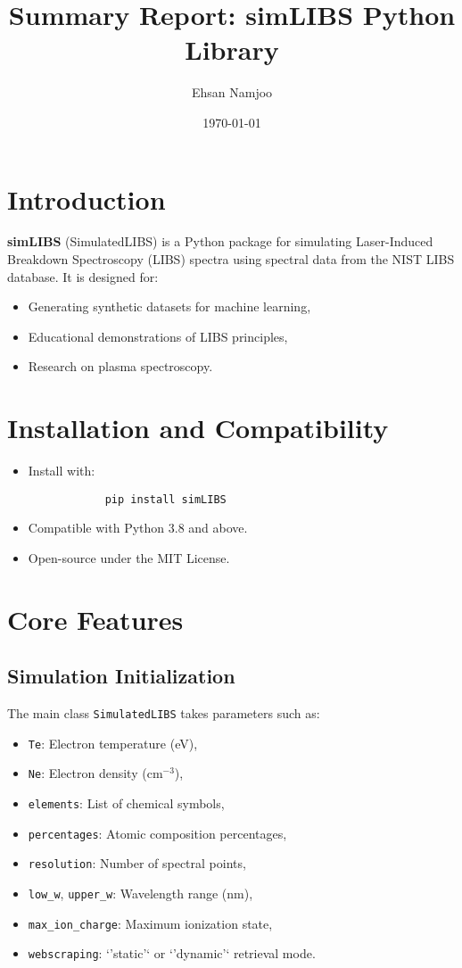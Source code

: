 \documentclass[12pt,a4paper]{article}
\title{Summary Report: simLIBS Python Library}
\author{Ehsan Namjoo}
\date{\today}
\begin{document}
	
	\maketitle
	\tableofcontents
	\newpage
	
	\section{Introduction}
	\textbf{simLIBS} (SimulatedLIBS) is a Python package for simulating Laser-Induced Breakdown Spectroscopy (LIBS) spectra using spectral data from the NIST LIBS database.  
	It is designed for:
	\begin{itemize}
		\item Generating synthetic datasets for machine learning,
		\item Educational demonstrations of LIBS principles,
		\item Research on plasma spectroscopy.
	\end{itemize}
	
	\section{Installation and Compatibility}
	\begin{itemize}
		\item Install with:
		\begin{verbatim}
			pip install simLIBS
		\end{verbatim}
		\item Compatible with Python 3.8 and above.
		\item Open-source under the MIT License.
	\end{itemize}
	
	\section{Core Features}
	\subsection{Simulation Initialization}
	The main class \texttt{SimulatedLIBS} takes parameters such as:
	\begin{itemize}
		\item \texttt{Te}: Electron temperature (eV),
		\item \texttt{Ne}: Electron density (cm$^{-3}$),
		\item \texttt{elements}: List of chemical symbols,
		\item \texttt{percentages}: Atomic composition percentages,
		\item \texttt{resolution}: Number of spectral points,
		\item \texttt{low\_w}, \texttt{upper\_w}: Wavelength range (nm),
		\item \texttt{max\_ion\_charge}: Maximum ionization state,
		\item \texttt{webscraping}: `'static'` or `'dynamic'` retrieval mode.
	\end{itemize}
	
\end{document}
